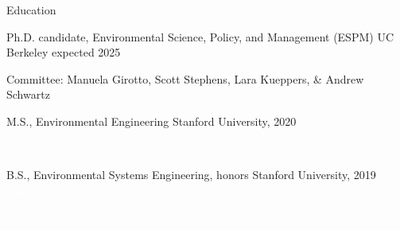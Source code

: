 \documentclass{cv}
\begin{document}
\begin{cSection}{Education}
\begin{cSubsection}{\vspace{1.6em} Ph.D. candidate, Environmental Science, Policy, and Management (ESPM)} {UC Berkeley} {} {expected 2025  }
\item Committee: Manuela Girotto, Scott Stephens, Lara Kueppers, \& Andrew Schwartz
\end{cSubsection}
\begin{cSubsection}{M.S., Environmental Engineering} {Stanford University, 2020} {}{  }
\item  \textcolor{white}{whitespace} \vspace{-2em}
\end{cSubsection}
\begin{cSubsection}{B.S., Environmental Systems Engineering, honors} {Stanford University, 2019} {\textcolor{white}{whitespace}}{  }
\item  \textcolor{white}{whitespace} \vspace{-2em}
\end{cSubsection}
\end{cSection}
\vspace{-0.2cm}
\end{document}
